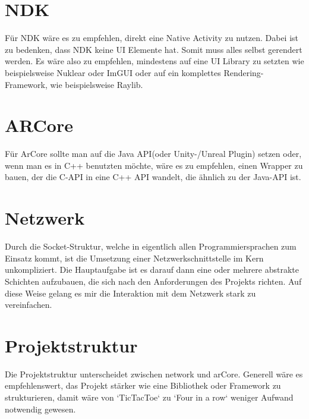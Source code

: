 \section{NDK}
Für NDK wäre es zu empfehlen, direkt eine Native Activity zu nutzen.
Dabei ist zu bedenken, dass NDK keine UI Elemente hat. Somit muss alles selbst
gerendert werden. Es wäre also zu empfehlen, mindestens auf eine UI Library zu setzten
wie beispielsweise Nuklear oder ImGUI oder auf ein komplettes Rendering-Framework,
wie beispielsweise Raylib.


\section{ARCore}
Für ArCore sollte man auf die Java API(oder Unity-/Unreal Plugin) setzen oder,
wenn man es in C++ benutzten möchte, wäre es zu empfehlen, einen Wrapper zu bauen, der die
C-API in eine C++ API wandelt, die ähnlich zu der Java-API ist.


\section{Netzwerk}
Durch die Socket-Struktur, welche in eigentlich allen Programmiersprachen zum Einsatz kommt,
ist die Umsetzung einer Netzwerkschnittstelle im Kern unkompliziert. Die Hauptaufgabe ist es darauf
dann eine oder mehrere abstrakte Schichten aufzubauen, die sich nach den Anforderungen des Projekts
richten. Auf diese Weise gelang es mir die Interaktion mit dem Netzwerk stark zu vereinfachen.


\section{Projektstruktur}
Die Projektstruktur unterscheidet zwischen network und arCore. Generell wäre es empfehlenswert, das Projekt stärker wie eine Bibliothek oder Framework zu strukturieren, damit wäre von `TicTacToe` zu `Four in a row` weniger Aufwand notwendig gewesen.
